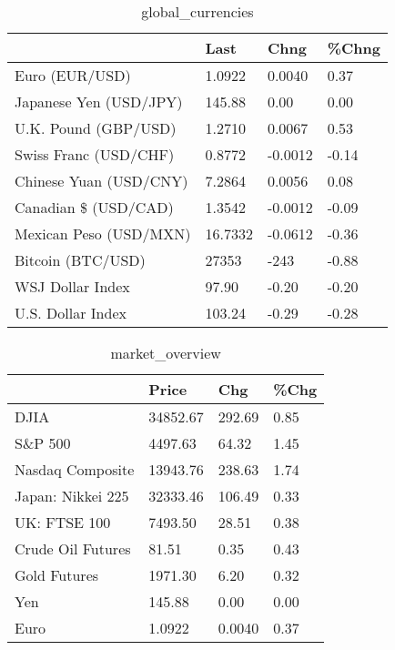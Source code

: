 \documentclass{article}%
\begin{document}
%


\begin{table}[htbp]%
\caption{global\_currencies}%
\centering%
\begin{adjustbox}{width=1\textwidth}%
\begin{tabular}{llll}
\toprule
                       &    Last &    Chng & \%Chng \\
\midrule
        Euro (EUR/USD) &  1.0922 &  0.0040 &  0.37 \\
Japanese Yen (USD/JPY) &  145.88 &    0.00 &  0.00 \\
  U.K. Pound (GBP/USD) &  1.2710 &  0.0067 &  0.53 \\
 Swiss Franc (USD/CHF) &  0.8772 & -0.0012 & -0.14 \\
Chinese Yuan (USD/CNY) &  7.2864 &  0.0056 &  0.08 \\
  Canadian \$ (USD/CAD) &  1.3542 & -0.0012 & -0.09 \\
Mexican Peso (USD/MXN) & 16.7332 & -0.0612 & -0.36 \\
     Bitcoin (BTC/USD) &   27353 &    -243 & -0.88 \\
      WSJ Dollar Index &   97.90 &   -0.20 & -0.20 \\
     U.S. Dollar Index &  103.24 &   -0.29 & -0.28 \\
\bottomrule
\end{tabular}
%
\end{adjustbox}%
\end{table}

%


\begin{table}[htbp]%
\caption{market\_overview}%
\centering%
\begin{adjustbox}{width=1\textwidth}%
\begin{tabular}{llll}
\toprule
                  &    Price &    Chg & \%Chg \\
\midrule
             DJIA & 34852.67 & 292.69 & 0.85 \\
          S\&P 500 &  4497.63 &  64.32 & 1.45 \\
 Nasdaq Composite & 13943.76 & 238.63 & 1.74 \\
Japan: Nikkei 225 & 32333.46 & 106.49 & 0.33 \\
     UK: FTSE 100 &  7493.50 &  28.51 & 0.38 \\
Crude Oil Futures &    81.51 &   0.35 & 0.43 \\
     Gold Futures &  1971.30 &   6.20 & 0.32 \\
              Yen &   145.88 &   0.00 & 0.00 \\
             Euro &   1.0922 & 0.0040 & 0.37 \\
\bottomrule
\end{tabular}
%
\end{adjustbox}%
\end{table}

%
\end{document}
